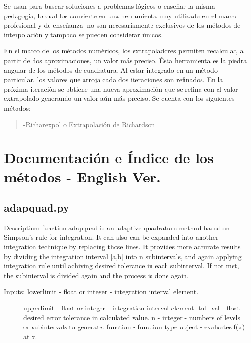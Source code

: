 \documentclass[letterpaper,10pt,oneside]{sphinxmanual}
\theoremstyle{plain}%
\theoremstyle{definition}%
\theoremstyle{remark}%
\begin{document}
Se usan para buscar soluciones a problemas lógicos o enseñar la misma pedagogía, lo cual los convierte en una herramienta muy utilizada en el marco
profesional y de enseñanza, no son necesariamente exclusivos de los métodos de interpolación y tampoco se pueden considerar únicos.

En el marco de los métodos numéricos, los extrapoladores permiten recalcular, a partir de dos aproximaciones, un valor más preciso. Ésta herramienta es la piedra angular de los métodos de cuadratura. Al estar integrado en un método particular, los valores que arroja cada dos iteraciones son refinados. En la próxima iteración se obtiene una nueva aproximación que se refina con el valor extrapolado generando un valor aún más preciso.
Se cuenta con los siguientes métodos:
\begin{quote}

-Richarexpol o Extrapolación de Richardson
\end{quote}


\chapter{Documentación e Índice de los métodos - English Ver.}
\label{code::doc}\label{code:documentacion-e-indice-de-los-metodos-english-ver}

\section{adapquad.py}
\label{code:module-adapquad}\label{code:adapquad-py}
Description: function adapquad is an adaptive quadrature method based on 
Simpson's rule for integration. It can also can be expanded into another 
integration technique by replacing those lines. It provides more accurate 
results by dividing the integration interval {[}a,b{]} into n subintervals, 
and again applying integration rule until achiving desired tolerance in 
each subinterval. If not met, the subinterval is divided again and the 
process is done again.
\begin{description}
\item[{Inputs: lowerlimit - float or integer - integration interval element.}] \leavevmode
upperlimit - float or integer - integration interval element.
tol\_val - float - desired error tolerance in calculated value.
n - integer - numbers of levels or subintervals to generate.
function - function type object - evaluates f(x) at x.

\end{description}
\end{document}
